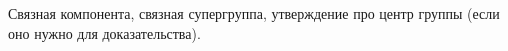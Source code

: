 Связная компонента, связная супергруппа, 
утверждение про центр группы (если оно нужно для доказательства).
\cite{affine_quotients}





\proof {
\qedhere
}
